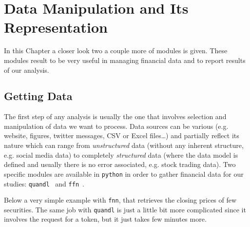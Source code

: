 \chapter{Data Manipulation and Its Representation}
\label{sec:datamanip}

In this Chapter a closer look two a couple more of modules is given. These modules result to be very useful in managing financial data and to report results of our analysis.

\section{Getting Data}\label{getting-data}

The first step of any analysis is usually the one that involves selection and manipulation of data we want to process. Data sources can be various (e.g. website, figures, twitter messages, CSV or Excel files\ldots) and partially reflect its nature which can range from \emph{unstructured} data (without any inherent structure, e.g. social media data) to completely \emph{structured} data (where the data model is defined and usually there is no error associated, e.g. stock trading data).
Two specific modules are available in \texttt{python} in order to gather financial data for our studies: \texttt{quandl}~\cite{quandl} and \texttt{ffn}~\cite{ffn}.

Below a very simple example with \texttt{fnn}, that retrieves the closing prices of few securities. The same job with \texttt{quandl} is just a little bit 
more complicated since it involves the request for a token, but it just takes 
few minutes more.  

